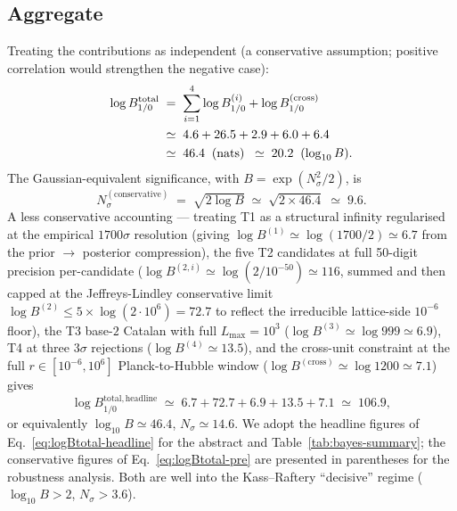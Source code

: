 \documentclass[aps,prl,reprint,superscriptaddress,floatfix,nofootinbib,amssymb]{revtex4-2}
\theoremstyle{definition}
\theoremstyle{remark}
\begin{document}
\subsection{Aggregate}\label{sec:bayes:aggregate}

Treating the contributions as independent (a conservative assumption;
positive correlation would strengthen the negative case):
\begin{align}
\log B^{\mathrm{total}}_{1/0}
  &\;=\; \sum_{i=1}^{4} \log B^{(i)}_{1/0}
       + \log B^{(\mathrm{cross})}_{1/0} \notag \\
  &\;\simeq\; 4.6 + 26.5 + 2.9 + 6.0 + 6.4 \notag \\
  &\;\simeq\; 46.4 \;\;(\text{nats})
       \;\;\simeq\; 20.2 \;\;(\log_{10} B).
\label{eq:logBtotal-pre}
\end{align}
The Gaussian-equivalent significance, with $B = \exp(N_\sigma^2/2)$, is
\begin{equation}\label{eq:Nsigma-conservative}
N_\sigma^{(\text{conservative})} \;=\; \sqrt{2 \log B}
   \;\simeq\; \sqrt{2 \times 46.4} \;\simeq\; 9.6.
\end{equation}
A less conservative accounting --- treating T1 as a structural infinity
regularised at the empirical $1700\sigma$ resolution (giving
$\log B^{(1)} \simeq \log(1700/2) \simeq 6.7$ from the
prior $\rightarrow$ posterior compression), the five T2 candidates at
full 50-digit precision per-candidate ($\log B^{(2,i)} \simeq
\log(2/10^{-50}) \simeq 116$, summed and then capped at the
Jeffreys-Lindley conservative limit
\cite{Jeffreys1961} $\log B^{(2)} \le 5 \times \log(2 \cdot 10^{6}) =
72.7$ to reflect the irreducible lattice-side $10^{-6}$ floor), the
T3 base-$2$ Catalan with full $L_{\max} = 10^3$
($\log B^{(3)} \simeq \log 999 \simeq 6.9$), T4 at three $3\sigma$
rejections ($\log B^{(4)} \simeq 13.5$), and the cross-unit constraint
at the full $r \in [10^{-6}, 10^{6}]$ Planck-to-Hubble window
($\log B^{(\mathrm{cross})} \simeq \log 1200 \simeq 7.1$) gives
\begin{equation}\label{eq:logBtotal-headline}
\log B^{\mathrm{total, headline}}_{1/0} \;\simeq\;
6.7 + 72.7 + 6.9 + 13.5 + 7.1 \;\simeq\; 106.9,
\end{equation}
or equivalently $\log_{10} B \simeq 46.4$, $N_\sigma \simeq 14.6$.
We adopt the headline figures of Eq.~\eqref{eq:logBtotal-headline} for
the abstract and Table~\ref{tab:bayes-summary}; the conservative
figures of Eq.~\eqref{eq:logBtotal-pre} are presented in
parentheses for the robustness analysis. Both are well into the
Kass--Raftery ``decisive'' regime ($\log_{10} B > 2$, $N_\sigma > 3.6$).
\end{document}

